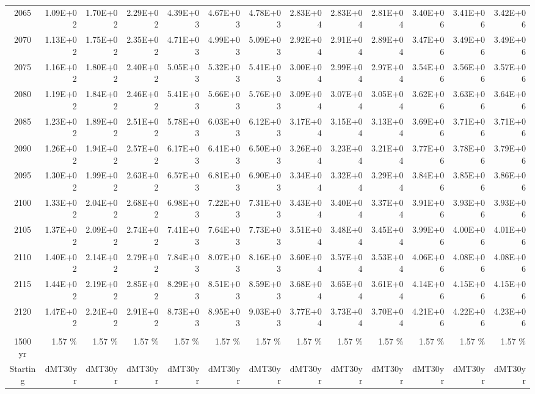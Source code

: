 \documentclass{article}
\begin{document}
\begin{table}
\begin{tabular}{crrr|rrr|rrr|rrr}
2065     & 1.09E+02 & 1.70E+02 & 2.29E+02 & 4.39E+03 & 4.67E+03 & 4.78E+03 & 2.83E+04 & 2.83E+04 & 2.81E+04 & 3.40E+06 & 3.41E+06 & 3.42E+06 \\
2070     & 1.13E+02 & 1.75E+02 & 2.35E+02 & 4.71E+03 & 4.99E+03 & 5.09E+03 & 2.92E+04 & 2.91E+04 & 2.89E+04 & 3.47E+06 & 3.49E+06 & 3.49E+06 \\
2075     & 1.16E+02 & 1.80E+02 & 2.40E+02 & 5.05E+03 & 5.32E+03 & 5.41E+03 & 3.00E+04 & 2.99E+04 & 2.97E+04 & 3.54E+06 & 3.56E+06 & 3.57E+06 \\
2080     & 1.19E+02 & 1.84E+02 & 2.46E+02 & 5.41E+03 & 5.66E+03 & 5.76E+03 & 3.09E+04 & 3.07E+04 & 3.05E+04 & 3.62E+06 & 3.63E+06 & 3.64E+06 \\
2085     & 1.23E+02 & 1.89E+02 & 2.51E+02 & 5.78E+03 & 6.03E+03 & 6.12E+03 & 3.17E+04 & 3.15E+04 & 3.13E+04 & 3.69E+06 & 3.71E+06 & 3.71E+06 \\
2090     & 1.26E+02 & 1.94E+02 & 2.57E+02 & 6.17E+03 & 6.41E+03 & 6.50E+03 & 3.26E+04 & 3.23E+04 & 3.21E+04 & 3.77E+06 & 3.78E+06 & 3.79E+06 \\
2095     & 1.30E+02 & 1.99E+02 & 2.63E+02 & 6.57E+03 & 6.81E+03 & 6.90E+03 & 3.34E+04 & 3.32E+04 & 3.29E+04 & 3.84E+06 & 3.85E+06 & 3.86E+06 \\
2100     & 1.33E+02 & 2.04E+02 & 2.68E+02 & 6.98E+03 & 7.22E+03 & 7.31E+03 & 3.43E+04 & 3.40E+04 & 3.37E+04 & 3.91E+06 & 3.93E+06 & 3.93E+06 \\
2105     & 1.37E+02 & 2.09E+02 & 2.74E+02 & 7.41E+03 & 7.64E+03 & 7.73E+03 & 3.51E+04 & 3.48E+04 & 3.45E+04 & 3.99E+06 & 4.00E+06 & 4.01E+06 \\
2110     & 1.40E+02 & 2.14E+02 & 2.79E+02 & 7.84E+03 & 8.07E+03 & 8.16E+03 & 3.60E+04 & 3.57E+04 & 3.53E+04 & 4.06E+06 & 4.08E+06 & 4.08E+06 \\
2115     & 1.44E+02 & 2.19E+02 & 2.85E+02 & 8.29E+03 & 8.51E+03 & 8.59E+03 & 3.68E+04 & 3.65E+04 & 3.61E+04 & 4.14E+06 & 4.15E+06 & 4.15E+06 \\
2120     & 1.47E+02 & 2.24E+02 & 2.91E+02 & 8.73E+03 & 8.95E+03 & 9.03E+03 & 3.77E+04 & 3.73E+04 & 3.70E+04 & 4.21E+06 & 4.22E+06 & 4.23E+06 \\
         &          &          &          &          &          &          &          &          &          &          &          &          \\ \hline
1500 yr  & 1.57 \%  & 1.57 \%  & 1.57 \%  & 1.57 \%  & 1.57 \%  & 1.57 \%  & 1.57 \%  & 1.57 \%  & 1.57 \%  & 1.57 \%  & 1.57 \%  & 1.57 \%  \\
Starting & dMT30yr  & dMT30yr  & dMT30yr  & dMT30yr  & dMT30yr  & dMT30yr  & dMT30yr  & dMT30yr  & dMT30yr  & dMT30yr  & dMT30yr  & dMT30yr  \\

\end{tabular}
\end{table}
\end{document}
